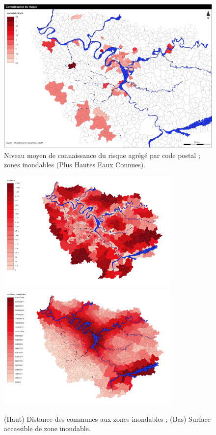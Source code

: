 \begin{figure}
\centering
\includegraphics[width=\textwidth,height=0.43\textheight]{maps/knowledge_moreclass}
\caption{Niveau moyen de connaissance du risque agrégé par code postal ; zones inondables (Plus Hautes Eaux Connues).}
\end{figure}



\begin{figure}
\centering
\includegraphics[width=0.8\textwidth]{maps/distance2}
\includegraphics[width=0.8\textwidth]{maps/surfponderee}
\caption{(Haut) Distance des communes aux zones inondables ; (Bas) Surface accessible de zone inondable.}
\end{figure}





